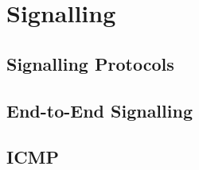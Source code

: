 \section{Signalling}

\subsection{Signalling Protocols}

\subsection{End-to-End Signalling}

\subsection{ICMP}



